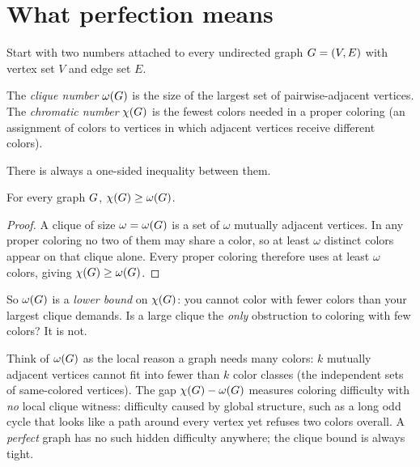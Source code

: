 \chapterline

\section{What perfection means}

Start with two numbers attached to every undirected graph $G=(V,E)$ with vertex set $V$ and edge set $E$.

\begin{definition}\label{ch30:def-omega-chi}
The \emph{clique number} $\omega(G)$ is the size of the largest set of pairwise-adjacent vertices. The \emph{chromatic number} $\chi(G)$ is the fewest colors needed in a proper coloring (an assignment of colors to vertices in which adjacent vertices receive different colors).
\end{definition}

There is always a one-sided inequality between them.

\begin{proposition}\label{ch30:prop-trivial-bound}
For every graph $G$, $\chi(G)\ge\omega(G)$.
\end{proposition}

\begin{proof}
A clique of size $\omega=\omega(G)$ is a set of $\omega$ mutually adjacent vertices. In any proper coloring no two of them may share a color, so at least $\omega$ distinct colors appear on that clique alone. Every proper coloring therefore uses at least $\omega$ colors, giving $\chi(G)\ge\omega(G)$.
\end{proof}

So $\omega(G)$ is a \emph{lower bound} on $\chi(G)$: you cannot color with fewer colors than your largest clique demands. Is a large clique the \emph{only} obstruction to coloring with few colors? It is not.

\begin{intuitionbox}
Think of $\omega(G)$ as the local reason a graph needs many colors: $k$ mutually adjacent vertices cannot fit into fewer than $k$ color classes (the independent sets of same-colored vertices). The gap $\chi(G)-\omega(G)$ measures coloring difficulty with \emph{no} local clique witness: difficulty caused by global structure, such as a long odd cycle that looks like a path around every vertex yet refuses two colors overall. A \emph{perfect} graph has no such hidden difficulty anywhere; the clique bound is always tight.
\end{intuitionbox}

